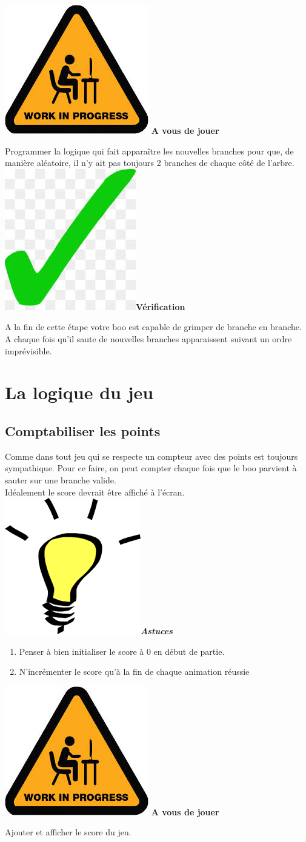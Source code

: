 \documentclass[french]{article}
\newcommand{\tips}{\includegraphics[scale=0.08]{tips}\textbf{\textit{Astuces\\}}}
\newcommand{\todo}{\includegraphics[scale=0.1]{work_in_progress}\textbf{ A vous de jouer\\} }
\newcommand{\result}{\includegraphics[scale=0.1]{green_tick}\textbf{Vérification\\}}
\begin{document}
\todo

Programmer la logique qui fait apparaître les nouvelles branches pour que, de manière aléatoire, il n'y ait pas toujours 2 branches de chaque côté de l'arbre.\\

\result

A la fin de cette étape votre boo est capable de grimper de branche en branche. A chaque fois qu'il saute de nouvelles branches apparaissent suivant un ordre imprévisible.

\section{La logique du jeu}

\begin{abstract}
	Nous avons jusqu'à présent programmé tous les éléments visibles. Cependant, il n'est toujours pas possible à ce stade ni de gagner, ni de perdre. En effet, même si votre personnage saute du côté où il n'y a pas de branche, rien ne se passe. Il est donc à présent temps de passer à la logique opérationnelle du jeu elle-même
\end{abstract}

\subsection{Comptabiliser les points}

Comme dans tout jeu qui se respecte un compteur avec des points est toujours sympathique. Pour ce faire, on peut compter chaque fois que le boo parvient à sauter sur une branche valide.\\

Idéalement le score devrait être affiché à l'écran.\\

\tips

\begin{enumerate}

\item Penser à bien initialiser le score à 0 en début de partie.

\item N'incrémenter le score qu'à la fin de chaque animation réussie\\

\end{enumerate}	

\todo

Ajouter et afficher le score du jeu.\\
\end{document}
